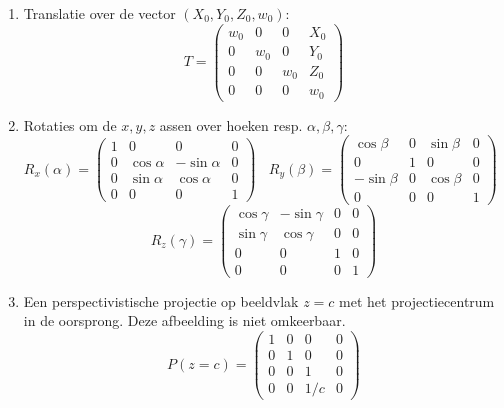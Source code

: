 \begin{enumerate}
\item Translatie over de vector $(X_0, Y_0, Z_0, w_0)$:
\[
T=\left(\begin{array}{cccc}
w_0&0&0&X_0\\
0&w_0&0&Y_0\\
0&0&w_0&Z_0\\
0&0&0&w_0
\end{array}\right)
\]
\item Rotaties om de $x,y,z$ assen over hoeken resp. $\alpha,\beta,\gamma$:
\[
R_x(\alpha)=\left(\begin{array}{cccc}
1&0&0&0\\
0&\cos\alpha&-\sin\alpha&0\\
0&\sin\alpha&\cos\alpha&0\\
0&0&0&1
\end{array}\right)~~~~
R_y(\beta)=\left(\begin{array}{cccc}
\cos\beta&0&\sin\beta&0\\
0&1&0&0\\
-\sin\beta&0&\cos\beta&0\\
0&0&0&1
\end{array}\right)~~~~
\]
\[
R_z(\gamma)=\left(\begin{array}{cccc}
\cos\gamma&-\sin\gamma&0&0\\
\sin\gamma&\cos\gamma&0&0\\
0&0&1&0\\
0&0&0&1
\end{array}\right)
\]
\item Een perspectivistische projectie op beeldvlak $z=c$ met het
      projectiecentrum in de oorsprong. Deze afbeelding is niet omkeerbaar.
\[
P(z=c)=\left(\begin{array}{cccc}
1&0&0&0\\
0&1&0&0\\
0&0&1&0\\
0&0&1/c&0
\end{array}\right)
\]
\end{enumerate}

